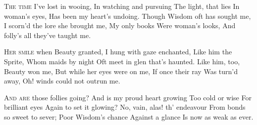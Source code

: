 \documentclass[fontsize=9, a5paper]{scrbook}
\newcommand\blankpage{%
    \null
    \thispagestyle{empty}%
    \addtocounter{page}{-1}%
    \newpage}
\begin{document}
\afterpage{\blankpage}
\begin{poem}
	\begin{stanza}
		\textsc{The time} I’ve lost in wooing,\verseline
		In watching and pursuing\verseline
		The light, that lies\verseline
		In woman’s eyes,\verseline
		Has been my heart’s undoing.\verseline
		Though Wisdom oft has sought me,\verseline
		I scorn’d the lore she brought me,\verseline
		My only books\verseline
		Were woman’s looks,\verseline
		And folly’s all they’ve taught me.
	\end{stanza}
	
	\begin{stanza}
		\textsc{Her smile} when Beauty granted,\verseline
		I hung with gaze enchanted,\verseline
		Like him the Sprite,\verseline
		Whom maids by night\verseline
		Oft meet in glen that’s haunted.\verseline
		Like him, too, Beauty won me,\verseline
		But while her eyes were on me,\verseline
		If once their ray\verseline
		Was turn’d away,\verseline
		Oh! winds could not outrun me.
	\end{stanza}
	
	\begin{stanza}
		\textsc{And are} those follies going?\verseline
		And is my proud heart growing\verseline
		Too cold or wise\verseline
		For brilliant eyes\verseline
		Again to set it glowing?\verseline
		No, vain, alas! th’ endeavour\verseline
		From bonds so sweet to sever;\verseline
		Poor Wisdom’s chance\verseline
		Against a glance\verseline
		Is now as weak as ever.
	\end{stanza}
\end{poem}

\pagebreak
\end{document}
